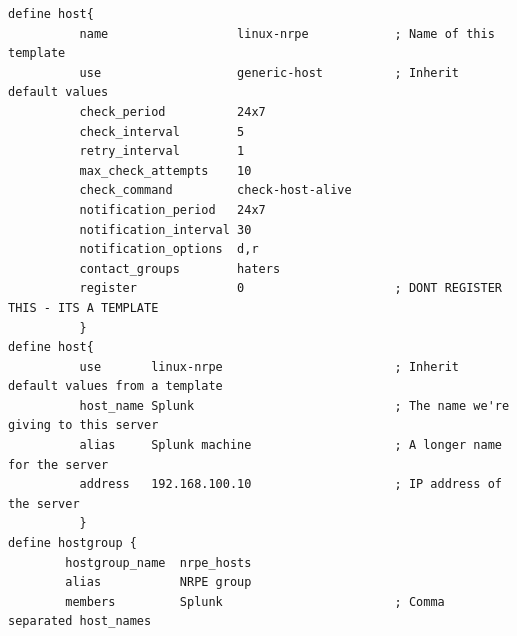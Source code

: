 \documentclass[10pt,a4paper,final]{report}
\begin{document}
\begin{lstlisting}
define host{
          name                  linux-nrpe            ; Name of this template
          use                   generic-host          ; Inherit default values
          check_period          24x7
          check_interval        5
          retry_interval        1
          max_check_attempts    10
          check_command         check-host-alive
          notification_period   24x7
          notification_interval 30
          notification_options  d,r
          contact_groups        haters
          register              0                     ; DONT REGISTER THIS - ITS A TEMPLATE
          }
define host{
          use       linux-nrpe                        ; Inherit default values from a template
          host_name Splunk                            ; The name we're giving to this server
          alias     Splunk machine                    ; A longer name for the server
          address   192.168.100.10                    ; IP address of the server
          }
define hostgroup {
        hostgroup_name  nrpe_hosts
        alias           NRPE group
        members         Splunk                        ; Comma separated host_names


\end{lstlisting}
\end{document}

